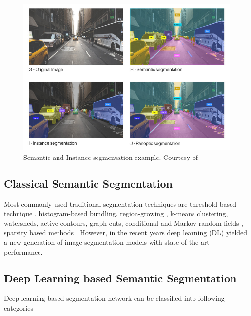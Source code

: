     \begin{figure}[h]
    	\centering
    	\includegraphics[width=12cm]{images/ss.jpg}
    	\caption{Semantic and Instance segmentation example. Courtesy of \cite{55_WinNT}}
    	\label{fig:SS}
    \end{figure}
    
    \subsection{Classical Semantic Segmentation}
    
    Most commonly used traditional segmentation techniques are threshold based technique \cite{56_otsu1979threshold}, histogram-based bundling, region-growing \cite{57_otsu1979threshold}, k-means clustering, watersheds, active contours, graph cuts, conditional and Markov random fields \cite{58_boykov2001fast}, sparsity based methods \cite{59_starck2005image}. However, in the recent years deep learning (DL) yielded a new generation of image segmentation models with state of the art performance. 
    
    \subsection{Deep Learning based  Semantic Segmentation}
    
    Deep learning based segmentation network can be classified into following categories \cite{60_minaee2021image}
    
